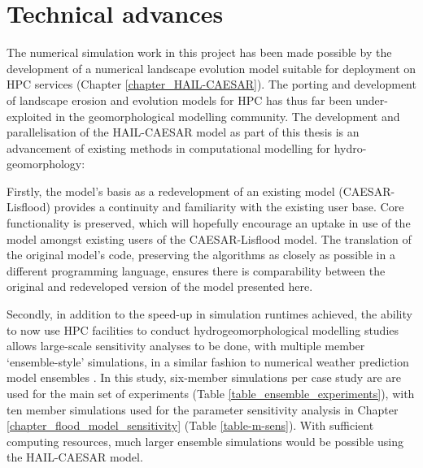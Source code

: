 \section{Technical advances}
The numerical simulation work in this project has been made possible by the development of a numerical landscape evolution model suitable for deployment on HPC services (Chapter \ref{chapter_HAIL-CAESAR}). The porting and development of landscape erosion and evolution models for HPC has thus far been under-exploited in the geomorphological modelling community. The development and parallelisation of the HAIL-CAESAR model as part of this thesis is an advancement of existing methods in computational modelling for hydro-geomorphology:

Firstly, the model's basis as a redevelopment of an existing model (CAESAR-Lisflood) provides a continuity and familiarity with the existing user base. Core functionality is preserved, which will hopefully encourage an uptake in use of the model amongst existing users of the CAESAR-Lisflood model. The translation of the original model's code, preserving the algorithms as closely as possible in a different programming language, ensures there is comparability between the original and redeveloped version of the model presented here. 

Secondly, in addition to the speed-up in simulation runtimes achieved, the ability to now use HPC facilities to conduct hydrogeomorphological modelling studies allows large-scale sensitivity analyses to be done, with multiple member `ensemble-style' simulations, in a similar fashion to numerical weather prediction model ensembles \citep{sivillo1997ensemble,klein2015variability}. In this study, six-member simulations per case study are are used for the main set of experiments (Table \ref{table_ensemble_experiments}), with ten member simulations used for the parameter sensitivity analysis in Chapter \ref{chapter_flood_model_sensitivity} (Table \ref{table-m-sens}). With sufficient computing resources, much larger ensemble simulations would be possible using the HAIL-CAESAR model.

